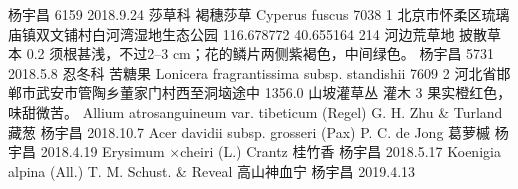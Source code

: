 \documentclass[autoduplicate]{nanicolle}
\begin{document}
	杨宇昌	6159	2018.9.24	莎草科	褐穗莎草	Cyperus fuscus	7038	1	北京市怀柔区琉璃庙镇双文铺村白河湾湿地生态公园	116.678772	40.655164	214	河边荒草地	披散草本	0.2		须根甚浅，不过2--3 cm；花的鳞片两侧紫褐色，中间绿色。
	杨宇昌	5731	2018.5.8	忍冬科	苦糖果	Lonicera fragrantissima subsp. standishii	7609	2	河北省邯郸市武安市管陶乡董家门村西至洞垴途中			1356.0	山坡灌草丛	灌木	3		果实橙红色，味甜微苦。
	Allium atrosanguineum var. tibeticum (Regel) G. H. Zhu & Turland	藏葱	杨宇昌		2018.10.7	
	Acer davidii subsp. grosseri (Pax) P. C. de Jong	葛萝槭	杨宇昌		2018.4.19	
	Erysimum ×cheiri (L.) Crantz	桂竹香	杨宇昌		2018.5.17	
	Koenigia alpina (All.) T. M. Schust. & Reveal	高山神血宁	杨宇昌		2019.4.13	
\end{document}

